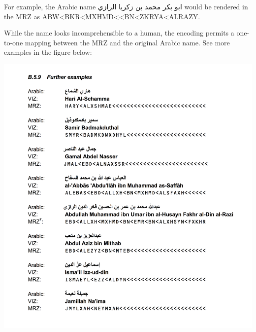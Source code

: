 For example, the Arabic name {\arfont ابو بكر محمد بن زكريا الرازي} would be
rendered in the MRZ as ABW<BKR<MXHMD<<BN<ZKRYA<ALRAZY.

While the name looks incomprehensible to a human, the encoding permits a
one-to-one mapping between the MRZ and the original Arabic name. See more
examples in the figure below:

\includegraphics[scale=0.6]{subtex/9309.3-appendix-b.5.9.png}

